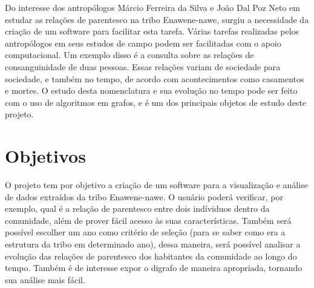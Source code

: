 \documentclass[a4paper,10pt]{article}
\begin{document}
Do interesse dos antropólogos Márcio Ferreira da Silva e João Dal Poz
Neto \cite{Marcio}
em estudar as relações de parentesco na tribo Enawene-nawe, 
surgiu a necessidade da criação de um software para facilitar esta
tarefa. Várias tarefas realizadas pelos antropólogos em seus estudos
de campo podem ser facilitadas com o apoio computacional. Um exemplo
disso é a consulta sobre as relações de consanguinidade de duas
pessoas. Essas relações variam de sociedade para sociedade, e também
no tempo, de acordo  com acontecimentos como casamentos e mortes. O
estudo desta nomenclatura e sua evolução no tempo pode ser feito com o
uso de algoritmos em grafos, e é um dos principais objetos de estudo
deste projeto. 
\section{Objetivos}
O projeto tem por objetivo a criação de um software para a visualização e análise de dados extraídos da tribo Enawene-nawe.
O usuário poderá verificar, por exemplo, qual é a relação de parentesco entre dois indíviduos dentro da comunidade, além de prover fácil acesso às suas características.
Também será possível escolher um ano como critério de seleção (para se saber como era a estrutura da tribo em determinado ano), dessa maneira, 
será possível analisar a evolução das relações de parentesco dos
habitantes da comunidade ao longo do tempo. Também é de interesse expor o digrafo de maneira apropriada, tornando sua análise mais fácil.
\end{document}
